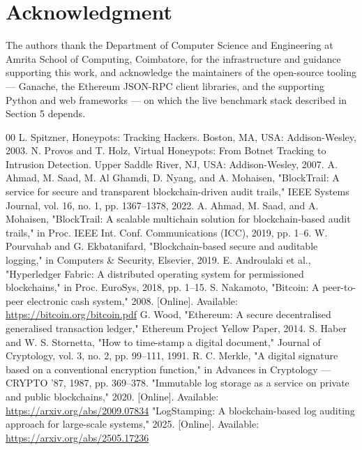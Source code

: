 \documentclass[journal]{IEEEtran}
\begin{document}
\section{Acknowledgment}

The authors thank the Department of Computer Science and Engineering at Amrita School of Computing, Coimbatore, for the infrastructure and guidance supporting this work, and acknowledge the maintainers of the open-source tooling --- Ganache, the Ethereum JSON-RPC client libraries, and the supporting Python and web frameworks --- on which the live benchmark stack described in Section 5 depends.


\begin{thebibliography}{00}
 L. Spitzner, Honeypots: Tracking Hackers. Boston, MA, USA: Addison-Wesley, 2003.
 N. Provos and T. Holz, Virtual Honeypots: From Botnet Tracking to Intrusion Detection. Upper Saddle River, NJ, USA: Addison-Wesley, 2007.
 A. Ahmad, M. Saad, M. Al Ghamdi, D. Nyang, and A. Mohaisen, "BlockTrail: A service for secure and transparent blockchain-driven audit trails," IEEE Systems Journal, vol. 16, no. 1, pp. 1367--1378, 2022.
 A. Ahmad, M. Saad, and A. Mohaisen, "BlockTrail: A scalable multichain solution for blockchain-based audit trails," in Proc. IEEE Int. Conf. Communications (ICC), 2019, pp. 1--6.
 W. Pourvahab and G. Ekbatanifard, "Blockchain-based secure and auditable logging," in Computers \& Security, Elsevier, 2019.
 E. Androulaki et al., "Hyperledger Fabric: A distributed operating system for permissioned blockchains," in Proc. EuroSys, 2018, pp. 1--15.
 S. Nakamoto, "Bitcoin: A peer-to-peer electronic cash system," 2008. [Online]. Available: \url{https://bitcoin.org/bitcoin.pdf}
 G. Wood, "Ethereum: A secure decentralised generalised transaction ledger," Ethereum Project Yellow Paper, 2014.
 S. Haber and W. S. Stornetta, "How to time-stamp a digital document," Journal of Cryptology, vol. 3, no. 2, pp. 99--111, 1991.
 R. C. Merkle, "A digital signature based on a conventional encryption function," in Advances in Cryptology --- CRYPTO '87, 1987, pp. 369--378.
 "Immutable log storage as a service on private and public blockchains," 2020. [Online]. Available: \url{https://arxiv.org/abs/2009.07834}
 "LogStamping: A blockchain-based log auditing approach for large-scale systems," 2025. [Online]. Available: \url{https://arxiv.org/abs/2505.17236}

\end{thebibliography}
\end{document}

